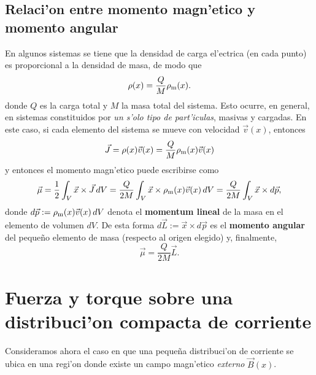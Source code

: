\subsection{Relaci'on entre momento magn'etico y momento angular}
En algunos sistemas se tiene que la densidad de carga el'ectrica (en cada
punto) es proporcional a la densidad de masa, de modo que
\begin{equation}
 \rho(x)=\frac{Q}{M} \rho_{\rm m}(x).
\end{equation}
donde $Q$ es la carga total y $M$ la masa total del sistema. Esto ocurre, en
general, en sistemas constituidos por \textit{un s'olo tipo de part'iculas},
masivas y cargadas. En este caso, si cada elemento del sistema se mueve
con velocidad $\vec{v}(x)$, entonces
\begin{equation}
\vec{J}=\rho(x)\vec{v}(x)=\frac{Q}{M} \rho_{\rm m}(x)\vec{v}(x)
\end{equation}
y entonces el momento magn'etico puede escribirse como
\begin{equation}
 \vec{\mu}=\frac{1}{2}\int_V \vec{x}\times\vec{J}\,dV=\frac{Q}{2M}\int_V
\vec{x}\times\rho_{\rm m}(x)\vec{v}(x)\,dV=\frac{Q}{2M}\int_V
\vec{x}\times d\vec{p},
\end{equation}
donde $d\vec{p}:=\rho_{\rm m}(x)\vec{v}(x)\,dV$ denota el \textbf{momentum lineal} de la masa en el elemento de volumen $dV$. De esta forma $d\vec{L}:=\vec{x}\times d\vec{p}$ es el \textbf{momento angular} del peque\~no elemento de masa (respecto al origen elegido) y, finalmente,
\begin{equation}
 \boxed{\vec{\mu}=\frac{Q}{2M}\vec{L}.}
\end{equation}

\section{Fuerza y torque sobre una distribuci'on compacta de corriente}
Consideramos ahora el caso en que una peque\~na distribuci'on de corriente
se ubica en una regi'on donde existe un campo magn'etico \textit{externo}
$\vec{B}(x)$.

